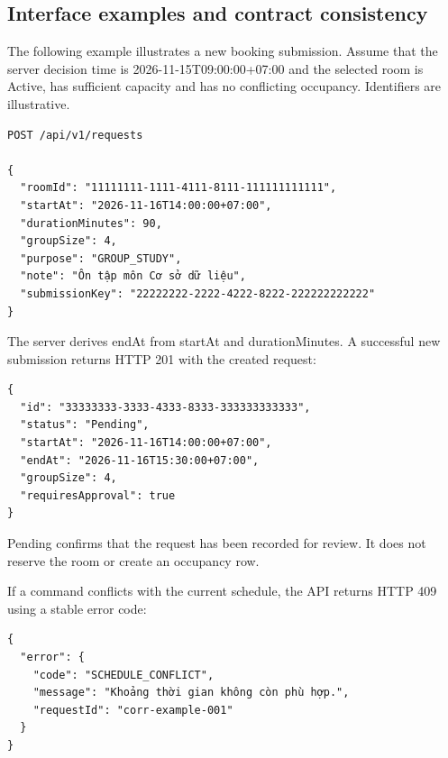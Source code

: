 \vspace{2mm}

\subsection{Interface examples and contract consistency}

The following example illustrates a new booking submission. Assume that the server decision time is 2026-11-15T09:00:00+07:00 and the selected room is Active, has sufficient capacity and has no conflicting occupancy. Identifiers are illustrative.\par

\begingroup
\small
\begin{samepage}
\begin{verbatim}
POST /api/v1/requests

{
  "roomId": "11111111-1111-4111-8111-111111111111",
  "startAt": "2026-11-16T14:00:00+07:00",
  "durationMinutes": 90,
  "groupSize": 4,
  "purpose": "GROUP_STUDY",
  "note": "Ôn tập môn Cơ sở dữ liệu",
  "submissionKey": "22222222-2222-4222-8222-222222222222"
}
\end{verbatim}
\end{samepage}
\endgroup

The server derives endAt from startAt and durationMinutes. A successful new submission returns HTTP 201 with the created request:\par

\begingroup
\small
\begin{samepage}
\begin{verbatim}
{
  "id": "33333333-3333-4333-8333-333333333333",
  "status": "Pending",
  "startAt": "2026-11-16T14:00:00+07:00",
  "endAt": "2026-11-16T15:30:00+07:00",
  "groupSize": 4,
  "requiresApproval": true
}
\end{verbatim}
\end{samepage}
\endgroup

Pending confirms that the request has been recorded for review. It does not reserve the room or create an occupancy row.\par

If a command conflicts with the current schedule, the API returns HTTP 409 using a stable error code:\par

\begingroup
\small
\begin{samepage}
\begin{verbatim}
{
  "error": {
    "code": "SCHEDULE_CONFLICT",
    "message": "Khoảng thời gian không còn phù hợp.",
    "requestId": "corr-example-001"
  }
}
\end{verbatim}
\end{samepage}
\endgroup

